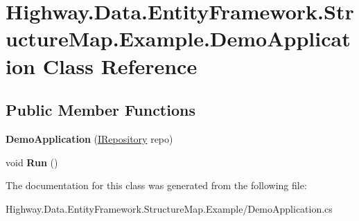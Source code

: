 \hypertarget{class_highway_1_1_data_1_1_entity_framework_1_1_structure_map_1_1_example_1_1_demo_application}{\section{Highway.\-Data.\-Entity\-Framework.\-Structure\-Map.\-Example.\-Demo\-Application Class Reference}
\label{class_highway_1_1_data_1_1_entity_framework_1_1_structure_map_1_1_example_1_1_demo_application}
}
\subsection*{Public Member Functions}
\begin{DoxyCompactItemize}
\item 
\hypertarget{class_highway_1_1_data_1_1_entity_framework_1_1_structure_map_1_1_example_1_1_demo_application_a3ee524d13dd594fde7f8980335284693}{{\bfseries Demo\-Application} (\hyperlink{interface_highway_1_1_data_1_1_interfaces_1_1_i_repository}{I\-Repository} repo)}\label{class_highway_1_1_data_1_1_entity_framework_1_1_structure_map_1_1_example_1_1_demo_application_a3ee524d13dd594fde7f8980335284693}

\item 
\hypertarget{class_highway_1_1_data_1_1_entity_framework_1_1_structure_map_1_1_example_1_1_demo_application_a672358624cc9a0dda17fc6f8ccb9a9f4}{void {\bfseries Run} ()}\label{class_highway_1_1_data_1_1_entity_framework_1_1_structure_map_1_1_example_1_1_demo_application_a672358624cc9a0dda17fc6f8ccb9a9f4}

\end{DoxyCompactItemize}


The documentation for this class was generated from the following file\-:\begin{DoxyCompactItemize}
\item 
Highway.\-Data.\-Entity\-Framework.\-Structure\-Map.\-Example/Demo\-Application.\-cs\end{DoxyCompactItemize}
